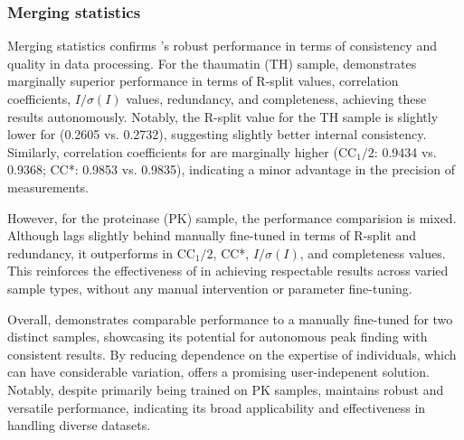 \documentclass[a4paper]{article}
\begin{document}
\subsubsection{Merging statistics}

Merging statistics confirms \peaknet{}'s robust performance in terms of
consistency and quality in data processing.  For the thaumatin (TH) sample,
\peaknet{} demonstrates marginally superior performance in terms of R-split
values, correlation coefficients, $I/\sigma(I)$ values, redundancy, and
completeness, achieving these results autonomously.  Notably, the R-split value
for the TH sample is slightly lower for \peaknet{} (0.2605 vs. 0.2732),
suggesting slightly better internal consistency. Similarly, correlation
coefficients for \peaknet{} are marginally higher (CC$_1/2$: 0.9434 vs.  0.9368;
CC*: 0.9853 vs. 0.9835), indicating a minor advantage in the precision of
measurements.

However, for the proteinase (PK) sample, the performance comparision is mixed.
Although \peaknet{} lags slightly behind manually fine-tuned \psocake{} in terms
of R-split and redundancy, it outperforms in CC$_1/2$, CC*, $I/\sigma(I)$, and
completeness values.  This reinforces the effectiveness of \peaknet{} in
achieving respectable results across varied sample types, without any manual
intervention or parameter fine-tuning.  

Overall, \peaknet{} demonstrates comparable performance to a manually fine-tuned
\psocake{} for two distinct samples, showcasing its potential for autonomous
peak finding with consistent results.  By reducing dependence on the expertise
of individuals, which can have considerable variation, \peaknet{} offers a
promising user-indepenent solution.  Notably, despite primarily being trained on
PK samples, \peaknet{} maintains robust and versatile performance, indicating
its broad applicability and effectiveness in handling diverse datasets.
\end{document}
